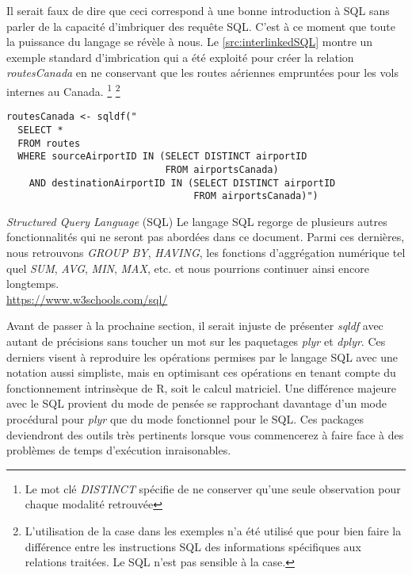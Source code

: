 \vspace{\baselineskip}
\noindent
Il serait faux de dire que ceci correspond à une bonne introduction à SQL sans parler de la capacité d'imbriquer des requête SQL. C'est à ce moment que toute la puissance du langage se révèle à nous. Le \autoref{src:interlinkedSQL} montre un exemple standard d'imbrication qui a été exploité pour créer la relation \emph{routesCanada} en ne conservant que les routes aériennes empruntées pour les vols internes au Canada. \footnote{Le mot clé \emph{DISTINCT} spécifie de ne conserver qu'une seule observation pour chaque modalité retrouvée} \footnote{L'utilisation de la case dans les exemples n'a été utilisé que pour bien faire la différence entre les instructions SQL des informations spécifiques aux relations traitées. Le SQL n'est pas sensible à la case.}

\begin{lstlisting}[caption = Fonctionnalités avancées de SQL,label=src:interlinkedSQL]
routesCanada <- sqldf("
  SELECT *
  FROM routes
  WHERE sourceAirportID IN (SELECT DISTINCT airportID
                            FROM airportsCanada)
    AND destinationAirportID IN (SELECT DISTINCT airportID
                                 FROM airportsCanada)")                           
\end{lstlisting}

\begin{moreInfo}{\emph{Structured Query Language} (SQL)}
	Le langage SQL regorge de plusieurs autres fonctionnalités qui ne seront pas abordées dans ce document. Parmi ces dernières, nous retrouvons \emph{GROUP BY}, \emph{HAVING}, les fonctions d'aggrégation numérique tel quel \emph{SUM}, \emph{AVG}, \emph{MIN}, \emph{MAX}, etc. et nous pourrions continuer ainsi encore longtemps. \\
	\url{https://www.w3schools.com/sql/}
\end{moreInfo}

\noindent
Avant de passer à la prochaine section, il serait injuste de présenter \emph{sqldf} avec autant de précisions sans toucher un mot sur les paquetages \emph{plyr} et \emph{dplyr}. Ces derniers visent à reproduire les opérations permises par le langage SQL avec une notation aussi simpliste, mais en optimisant ces opérations en tenant compte du fonctionnement intrinsèque de R, soit le calcul matriciel. Une différence majeure avec le SQL provient du mode de pensée se rapprochant davantage d'un mode procédural pour \emph{plyr} que du mode fonctionnel pour le SQL. Ces packages deviendront des outils très pertinents lorsque vous commencerez à faire face à des problèmes de temps d'exécution inraisonables.

